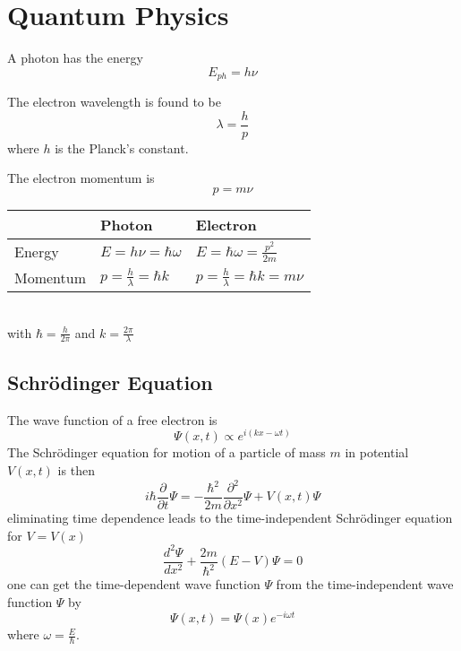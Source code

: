 \section{Quantum Physics}

A photon has the energy
\begin{equation}
    E_{ph} = h \nu
\end{equation}

The electron wavelength is found to be
\begin{equation}
    \lambda = \frac{h}{p}
\end{equation}
where $h$ is the Planck's constant.

The electron momentum is 
\begin{equation}
    p = m \nu
\end{equation}

\begin{table}[h!]
    \centering
    \begin{tabular}{lll}
        & Photon & Electron \\ \toprule
        Energy & $E = h \nu = \hbar \omega$ & $E = \hbar \omega = \frac{p^2}{2m}$ \\
        Momentum & $p = \frac{h}{\lambda} = \hbar k$ & $p = \frac{h}{\lambda} = \hbar k = m \nu$ \\ \bottomrule
    \end{tabular} \\
     with $\hbar = \frac{h}{2\pi}$ and $k = \frac{2\pi}{\lambda}$
\end{table}

\subsection{Schrödinger Equation}
The wave function of a free electron is
\begin{equation}
    \Psi(x,t) \propto e^{i (kx-\omega t)}
\end{equation}
The Schrödinger equation for motion of a particle of mass $m$ in potential $V(x,t)$ is then
\begin{equation}
    i \hbar \frac{\partial}{\partial t} \Psi = - \frac{\hbar^2}{2m}\frac{\partial^2}{\partial x^2} \Psi + V(x,t) \Psi
\end{equation}
eliminating time dependence leads to the time-independent Schrödinger equation for $V=V(x)$
\begin{equation}
    \frac{d^2 \varPsi}{d x^2} + \frac{2m}{\hbar^2}(E-V) \varPsi = 0
\end{equation}
one can get the time-dependent wave function $\Psi$ from the time-independent wave function $\varPsi$ by
\begin{equation}
    \Psi(x,t) = \varPsi(x) e^{-i \omega t}
\end{equation}
where $\omega = \frac{E}{\hbar}$.

